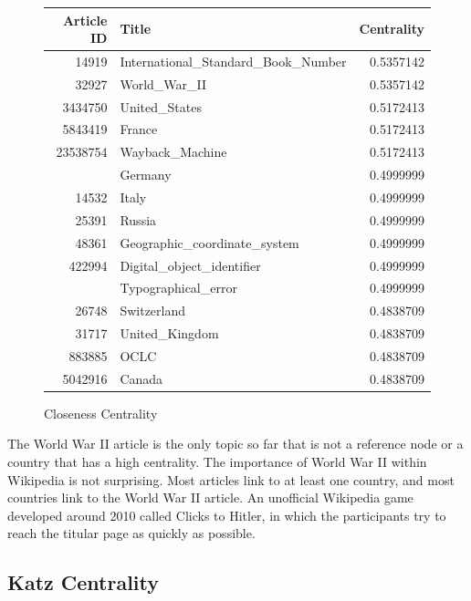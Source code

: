 \documentclass{article}
\begin{document}
\begin{figure}[H]
    \caption[fig]{Closeness Centrality}
    \centering
    \begin{tabular}{rlr}
        \toprule
        Article ID & Title & Centrality \\
        \midrule
        14919 & International\_Standard\_Book\_Number & 0.5357142\\
        32927 & World\_War\_II & 0.5357142\\
        3434750 & United\_States & 0.5172413\\
        5843419 & France & 0.5172413\\
        23538754 & Wayback\_Machine & 0.5172413\\
        \addlinespace
        11867 & Germany & 0.4999999\\
        14532 & Italy & 0.4999999\\
        25391 & Russia & 0.4999999\\
        48361 & Geographic\_coordinate\_system & 0.4999999\\
        422994 & Digital\_object\_identifier & 0.4999999\\
        \addlinespace
        1057428 & Typographical\_error & 0.4999999\\
        26748 & Switzerland & 0.4838709\\
        31717 & United\_Kingdom & 0.4838709\\
        883885 & OCLC & 0.4838709\\
        5042916 & Canada & 0.4838709\\
    \bottomrule
\end{tabular}
\end{figure}

The World War II article is the only topic so far that is not a reference node or a country that has a high centrality.
The importance of World War II within Wikipedia is not surprising.
Most articles link to at least one country, and most countries link to the World War II article.
An unofficial Wikipedia game developed around 2010 called Clicks to Hitler, in which the participants try to reach the titular page as quickly as possible.
\autocite{cornell}

\subsection{Katz Centrality}
\end{document}
